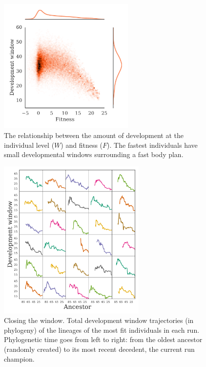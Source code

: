 \begin{figure}[t]
\centering
\includegraphics[width=0.6\textwidth]{Chapter03/img/window_gecco}
\caption{\label{fig:window} The relationship between the amount of development at the individual level ($W$) and fitness ($F$). The fastest individuals have small developmental windows surrounding a fast body plan.}
\end{figure}

\begin{figure}[t]
\centering
\includegraphics[width=0.65\textwidth]{Chapter03/img/ancestral_window_gecco}
\caption{\label{fig:ancestral_window} Closing the window. Total development window trajectories (in phylogeny) of the lineages of the most fit individuals in each run. Phylogenetic time goes from left to right: from the oldest ancestor (randomly created) to its most recent decedent, the current run champion.}
\end{figure}

